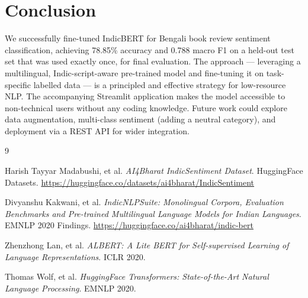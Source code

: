 \documentclass[11pt,a4paper]{article}
\begin{document}
\section{Conclusion}

We successfully fine-tuned IndicBERT for Bengali book review sentiment classification, achieving 78.85\% accuracy and 0.788 macro F1 on a held-out test set that was used exactly once, for final evaluation. The approach — leveraging a multilingual, Indic-script-aware pre-trained model and fine-tuning it on task-specific labelled data — is a principled and effective strategy for low-resource NLP. The accompanying Streamlit application makes the model accessible to non-technical users without any coding knowledge. Future work could explore data augmentation, multi-class sentiment (adding a neutral category), and deployment via a REST API for wider integration.

\begin{thebibliography}{9}

Harish Tayyar Madabushi, et al.
\textit{AI4Bharat IndicSentiment Dataset}.
HuggingFace Datasets. 
\url{https://huggingface.co/datasets/ai4bharat/IndicSentiment}

Divyanshu Kakwani, et al.
\textit{IndicNLPSuite: Monolingual Corpora, Evaluation Benchmarks and Pre-trained Multilingual Language Models for Indian Languages}.
EMNLP 2020 Findings.
\url{https://huggingface.co/ai4bharat/indic-bert}

Zhenzhong Lan, et al.
\textit{ALBERT: A Lite BERT for Self-supervised Learning of Language Representations}.
ICLR 2020.

Thomas Wolf, et al.
\textit{HuggingFace Transformers: State-of-the-Art Natural Language Processing}.
EMNLP 2020.

\end{thebibliography}
\end{document}
